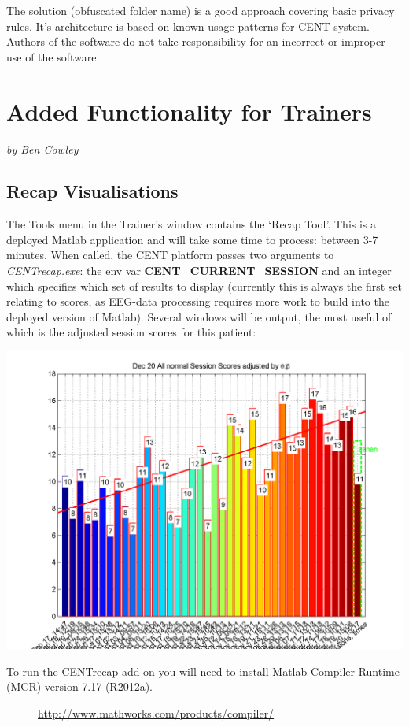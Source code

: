 \documentclass[letterpaper,10pt,english]{sphinxmanual}
\begin{document}
The solution (obfuscated folder name) is a good approach covering basic privacy rules. It's architecture is based on known usage patterns for CENT system. Authors of the software do not take responsibility for an incorrect or improper use of the software.


\section{\textbf{Added Functionality for Trainers}}
\label{index:added-functionality-for-trainers}\label{index:added-func-train}
\emph{by Ben Cowley}


\subsection{\textbf{Recap Visualisations}}
\label{index:recap-visualisations}
The Tools menu in the Trainer's window contains the `Recap Tool'. This is a deployed Matlab application and will take some time to process: between 3-7 minutes. When called, the CENT platform passes two arguments to \emph{CENTrecap.exe}: the env var \textbf{CENT\_CURRENT\_SESSION} and an integer which specifies which set of results to display (currently this is always the first set relating to scores, as EEG-data processing requires more work to build into the deployed version of Matlab).
Several windows will be output, the most useful of which is the adjusted session scores for this patient:

{\hfill\includegraphics{AdjustedSessionScores.png}\hfill}
\begin{description}
\item[{To run the CENTrecap add-on you will need to install Matlab Compiler Runtime (MCR) version 7.17 (R2012a).}] \leavevmode
\href{http://www.mathworks.com/products/compiler/}{http://www.mathworks.com/products/compiler/}

\end{description}
\end{document}
